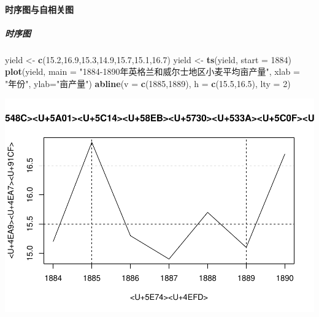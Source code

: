 \documentclass[]{article}
\newenvironment{Shaded}{\begin{snugshade}}{\end{snugshade}}
\newcommand{\DataTypeTok}[1]{\textcolor[rgb]{0.13,0.29,0.53}{#1}}
\newcommand{\DecValTok}[1]{\textcolor[rgb]{0.00,0.00,0.81}{#1}}
\newcommand{\FloatTok}[1]{\textcolor[rgb]{0.00,0.00,0.81}{#1}}
\newcommand{\KeywordTok}[1]{\textcolor[rgb]{0.13,0.29,0.53}{\textbf{#1}}}
\newcommand{\NormalTok}[1]{#1}
\newcommand{\StringTok}[1]{\textcolor[rgb]{0.31,0.60,0.02}{#1}}
\let\oldparagraph\paragraph
\renewcommand{\paragraph}[1]{\oldparagraph{#1}\mbox{}}
\let\oldsubparagraph\subparagraph
\renewcommand{\subparagraph}[1]{\oldsubparagraph{#1}\mbox{}}
\begin{document}
\hypertarget{ux65f6ux5e8fux56feux4e0eux81eaux76f8ux5173ux56fe}{%
\paragraph{时序图与自相关图}\label{ux65f6ux5e8fux56feux4e0eux81eaux76f8ux5173ux56fe}}

\hypertarget{ux65f6ux5e8fux56fe}{%
\subparagraph{时序图}\label{ux65f6ux5e8fux56fe}}

\begin{Shaded}
\begin{Highlighting}[]
\NormalTok{yield <-}\StringTok{ }\KeywordTok{c}\NormalTok{(}\FloatTok{15.2}\NormalTok{,}\FloatTok{16.9}\NormalTok{,}\FloatTok{15.3}\NormalTok{,}\FloatTok{14.9}\NormalTok{,}\FloatTok{15.7}\NormalTok{,}\FloatTok{15.1}\NormalTok{,}\FloatTok{16.7}\NormalTok{)}
\NormalTok{yield <-}\StringTok{ }\KeywordTok{ts}\NormalTok{(yield, }\DataTypeTok{start =} \DecValTok{1884}\NormalTok{)}
\KeywordTok{plot}\NormalTok{(yield, }\DataTypeTok{main =} \StringTok{"1884-1890年英格兰和威尔士地区小麦平均亩产量"}\NormalTok{, }
     \DataTypeTok{xlab =} \StringTok{"年份"}\NormalTok{, }\DataTypeTok{ylab=}\StringTok{"亩产量"}\NormalTok{)}
\KeywordTok{abline}\NormalTok{(}\DataTypeTok{v =} \KeywordTok{c}\NormalTok{(}\DecValTok{1885}\NormalTok{,}\DecValTok{1889}\NormalTok{), }
       \DataTypeTok{h =} \KeywordTok{c}\NormalTok{(}\FloatTok{15.5}\NormalTok{,}\FloatTok{16.5}\NormalTok{), }
       \DataTypeTok{lty =} \DecValTok{2}\NormalTok{)}
\end{Highlighting}
\end{Shaded}

\includegraphics{timeseries_files/figure-latex/unnamed-chunk-7-1.pdf}
\end{document}
